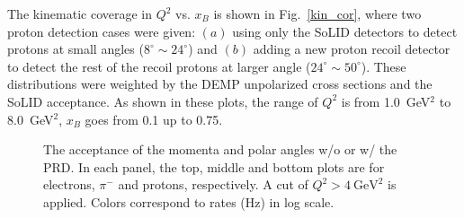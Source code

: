 The kinematic coverage in $Q^{2}$ vs. $x_{B}$ is shown in Fig.~\ref{kin_cor},
where two proton detection cases were given: $(a)$ using only the SoLID
detectors to detect protons at small angles ($8^{\circ}\sim24^{\circ}$) and
$(b)$ adding a new proton recoil detector to detect the rest of the recoil
protons at larger angle ($24^{\circ}\sim50^{\circ}$). These distributions were
weighted by the DEMP unpolarized cross sections and the SoLID acceptance.
As shown in these plots, the range of $Q^{2}$ is from 1.0~GeV$^{2}$ to
8.0~GeV$^{2}$, $x_{B}$ goes from 0.1 up to 0.75.

\begin{figure}[!ht]
 \begin{center}
  \caption[The acceptance of the momenta and scattering angles for electrons,
    $\pi^{-}$ and protons]{\footnotesize{The acceptance of the momenta and
    polar angles w/o or w/ the PRD. In each panel, the top, middle and
    bottom plots are for electrons, $\pi^{-}$ and protons, respectively. A
    cut of $Q^{2}>4~\mathrm{GeV^{2}}$ is applied. Colors correspond to rates
    (Hz) in log scale.}}
  \label{p_theta}
  \end{center}
\end{figure}


